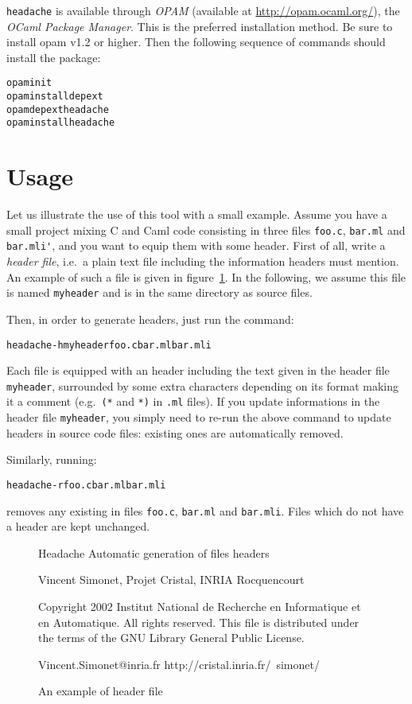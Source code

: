 \documentclass{article}
\newcommand{\headache}{\texttt{headache}}
\begin{document}
\headache{} is available through \emph{OPAM} (available at
\url{http://opam.ocaml.org/}), the \emph{OCaml Package Manager}.
This is the preferred installation method.
Be sure to install opam v1.2 or higher.
Then the following sequence of commands should install the package:
\begin{alltt}
  opam init
  opam install depext
  opam depext headache
  opam install headache
\end{alltt}

\section{Usage}

Let us illustrate the use of this tool with a small example.  Assume
you have a small project mixing C and Caml code consisting in three
files \verb+foo.c+, \verb+bar.ml+ and \verb+bar.mli'+, and you want to
equip them with some header.  First of all, write a \emph{header
  file}, i.e.\ a plain text file including the information headers
must mention.  An example of such a file is given in
figure~\ref{figure:header}.  In the following, we assume this file is
named \verb+myheader+ and is in the same directory as source files.

Then, in order to generate headers, just run the command:
\begin{alltt}
  headache -h myheader foo.c bar.ml bar.mli
\end{alltt}
Each file is equipped with an header including the text given in the
header file \verb+myheader+, surrounded by some extra characters
depending on its format making it a comment (e.g.\ \verb+(*+ and
\verb+*)+ in \verb+.ml+ files).  If you update informations in the
header file \verb+myheader+, you simply need to re-run the above
command to update headers in source code files: existing ones are
automatically removed.

Similarly, running:
\begin{alltt}
  headache -r foo.c bar.ml bar.mli
\end{alltt}
removes any existing in files \verb+foo.c+, \verb+bar.ml+ and
\verb+bar.mli+.  Files which do not have a header are kept unchanged.

\begin{figure}
\begin{center}
\begin{boxedverbatim}
                             Headache
               Automatic generation of files headers

        Vincent Simonet, Projet Cristal, INRIA Rocquencourt

Copyright 2002 
Institut National de Recherche en Informatique et en Automatique.
All rights reserved.  This file is distributed under the terms of
the GNU Library General Public License.

Vincent.Simonet@inria.fr           http://cristal.inria.fr/~simonet/
\end{boxedverbatim}
\end{center}
  \caption{An example of header file}
  \label{figure:header}
\end{figure}
\end{document}
